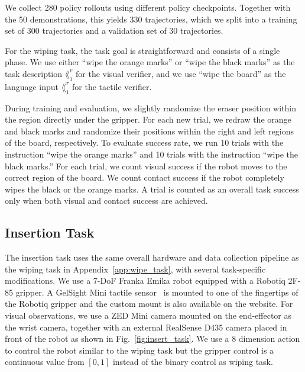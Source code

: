  We collect 280 policy rollouts using different policy checkpoints. Together with the 50 demonstrations, this yields 330 trajectories, which we split into a training set of 300 trajectories and a validation set of 30 trajectories.

 For the wiping task, the task goal is straightforward and consists of a single phase. We use either ``wipe the orange marks'' or ``wipe the black marks'' as the task description $\lang_1^v$ for the visual verifier, and we use ``wipe the board'' as the language input $\lang_1^\tau$ for the tactile verifier.

 During training and evaluation, we slightly randomize the eraser position within the region directly under the gripper. For each new trial, we redraw the orange and black marks and randomize their positions within the right and left regions of the board, respectively. To evaluate success rate, we run 10 trials with the instruction ``wipe the orange marks'' and 10 trials with the instruction ``wipe the black marks.'' For each trial, we count visual success if the robot moves to the correct region of the board. We count contact success if the robot completely wipes the black or the orange marks. A trial is counted as an overall task success only when both visual and contact success are achieved.



\subsection{Insertion Task}
\label{app:insertion_task}

 The insertion task uses the same overall hardware and data collection pipeline as the wiping task in Appendix~\ref{app:wipe_task}, with several task-specific modifications. We use a 7-DoF Franka Emika robot equipped with a Robotiq 2F-85 gripper. A GelSight Mini tactile sensor~\cite{yuan2017gelsight} is mounted to one of the fingertips of the Robotiq gripper and the custom mount is also available on the website. For visual observations, we use a ZED Mini camera mounted on the end-effector as the wrist camera, together with an external RealSense D435 camera placed in front of the robot as shown in Fig.~\ref{fig:insert_task}. We use a 8 dimension action to control the robot similar to the wiping task but the gripper control is a continuous value from $[0,1]$ instead of the binary control as wiping task.

